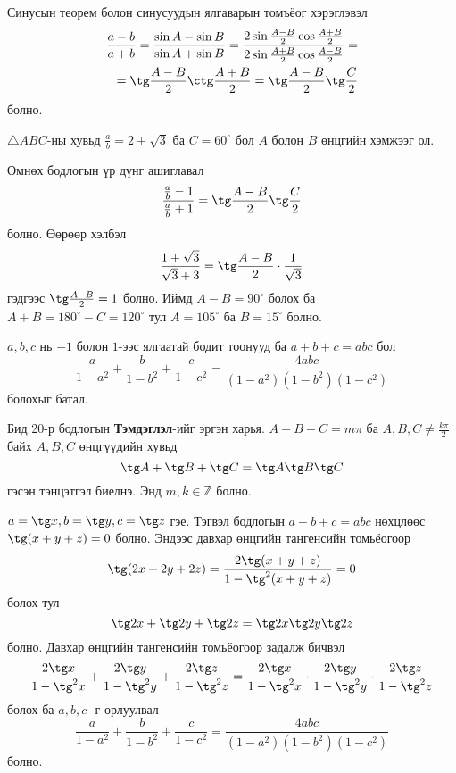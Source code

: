 \documentclass[10pt,a4paper,oneside]{book}
\begin{document}
\TheSolution
Синусын теорем болон синусуудын ялгаварын томъёог хэрэглэвэл
\begin{align*}
\frac{a-b}{a+b} = \frac{\sin A - \sin B}{\sin A + \sin B} = \frac{2\sin\frac{A-B}{2}\cos\frac{A+B}{2}}{2\sin\frac{A+B}{2}\cos\frac{A-B}{2}} = \\
= \tg\frac{A-B}{2}\ctg\frac{A+B}{2} = \tg\frac{A-B}{2}\tg\frac{C}{2}
\end{align*}
болно.

\Problem
$\triangle ABC$-ны хувьд $\frac{a}{b} = 2+\sqrt{3}$ ба $C = 60^\circ$ бол $A$ болон $B$ өнцгийн хэмжээг ол.

\TheSolution
Өмнөх бодлогын үр дүнг ашиглавал
\begin{equation*}
\frac{\frac{a}{b} - 1}{\frac{a}{b} + 1} = \tg \frac{A-B}{2}\tg\frac{C}{2}
\end{equation*}
болно. Өөрөөр хэлбэл
\begin{equation*}
\frac{1+\sqrt{3}}{\sqrt{3}+3} = \tg\frac{A-B}{2}\cdot \frac{1}{\sqrt{3}}
\end{equation*}
гэдгээс $\tg\frac{A-B}{2} = 1$ болно. Иймд $A-B = 90^\circ$ болох ба $A+B = 180^\circ - C = 120^\circ$ тул $A=105^\circ$ ба $B=15^\circ$ болно.

\Problem
$a, b, c$ нь $-1$ болон $1$-ээс ялгаатай бодит тоонууд ба $a+b+c = abc$ бол
\begin{equation*}
\frac{a}{1-a^2} + \frac{b}{1-b^2} + \frac{c}{1-c^2} = \frac{4abc}{(1-a^2)(1-b^2)(1-c^2)}
\end{equation*}
болохыг батал.

\TheSolution
Бид 20-р бодлогын \textbf{Тэмдэглэл}-ийг эргэн харья. $A+B+C = m\pi$ ба $A, B, C \neq \frac{k\pi}{2}$ байх $A, B, C$ өнцгүүдийн хувьд
\begin{equation*}
\tg A + \tg B + \tg C  = \tg A \tg B \tg C
\end{equation*}
гэсэн тэнцэтгэл биелнэ. Энд $m, k \in \mathbb{Z}$ болно.

$a=\tg x, b = \tg y, c=\tg z$ гэе. Тэгвэл бодлогын $a+b+c = abc$ нөхцлөөс $\tg(x+y+z) = 0$ болно. Эндээс давхар өнцгийн тангенсийн томьёогоор
\begin{equation*}
\tg (2x+2y+2z) = \frac{2\tg (x+y+z)}{1-\tg^2 (x+y+z)} = 0
\end{equation*}
болох тул
\begin{equation*}
\tg 2x + \tg 2y + \tg 2z = \tg 2x\tg 2y\tg 2z
\end{equation*}
болно. Давхар өнцгийн тангенсийн томьёогоор задалж бичвэл
\begin{equation*}
\frac{2\tg x}{1-\tg^2 x} + \frac{2\tg y}{1-\tg^2 y} + \frac{2\tg z}{1-\tg^2 z} = \frac{2\tg x}{1-\tg^2 x}\cdot           \frac{2\tg y}{1-\tg^2 y}\cdot \frac{2\tg z}{1-\tg^2 z}
\end{equation*}
болох ба $a, b, c$ -г орлуулвал
\begin{equation*}
\frac{a}{1-a^2} + \frac{b}{1-b^2} + \frac{c}{1-c^2} = \frac{4abc}{(1-a^2)(1-b^2)(1-c^2)}
\end{equation*}
болно.
\end{document}
